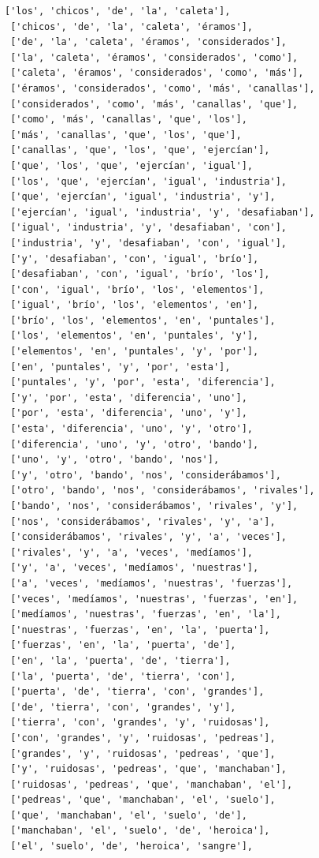 \documentclass[11pt]{article}
\begin{document}
\begin{tcolorbox}[breakable, size=fbox, boxrule=1pt, pad at break*=1mm,colback=cellbackground, colframe=cellborder]
\begin{Verbatim}[commandchars=\\\{\}]
 ['los', 'chicos', 'de', 'la', 'caleta'],
 ['chicos', 'de', 'la', 'caleta', 'éramos'],
 ['de', 'la', 'caleta', 'éramos', 'considerados'],
 ['la', 'caleta', 'éramos', 'considerados', 'como'],
 ['caleta', 'éramos', 'considerados', 'como', 'más'],
 ['éramos', 'considerados', 'como', 'más', 'canallas'],
 ['considerados', 'como', 'más', 'canallas', 'que'],
 ['como', 'más', 'canallas', 'que', 'los'],
 ['más', 'canallas', 'que', 'los', 'que'],
 ['canallas', 'que', 'los', 'que', 'ejercían'],
 ['que', 'los', 'que', 'ejercían', 'igual'],
 ['los', 'que', 'ejercían', 'igual', 'industria'],
 ['que', 'ejercían', 'igual', 'industria', 'y'],
 ['ejercían', 'igual', 'industria', 'y', 'desafiaban'],
 ['igual', 'industria', 'y', 'desafiaban', 'con'],
 ['industria', 'y', 'desafiaban', 'con', 'igual'],
 ['y', 'desafiaban', 'con', 'igual', 'brío'],
 ['desafiaban', 'con', 'igual', 'brío', 'los'],
 ['con', 'igual', 'brío', 'los', 'elementos'],
 ['igual', 'brío', 'los', 'elementos', 'en'],
 ['brío', 'los', 'elementos', 'en', 'puntales'],
 ['los', 'elementos', 'en', 'puntales', 'y'],
 ['elementos', 'en', 'puntales', 'y', 'por'],
 ['en', 'puntales', 'y', 'por', 'esta'],
 ['puntales', 'y', 'por', 'esta', 'diferencia'],
 ['y', 'por', 'esta', 'diferencia', 'uno'],
 ['por', 'esta', 'diferencia', 'uno', 'y'],
 ['esta', 'diferencia', 'uno', 'y', 'otro'],
 ['diferencia', 'uno', 'y', 'otro', 'bando'],
 ['uno', 'y', 'otro', 'bando', 'nos'],
 ['y', 'otro', 'bando', 'nos', 'considerábamos'],
 ['otro', 'bando', 'nos', 'considerábamos', 'rivales'],
 ['bando', 'nos', 'considerábamos', 'rivales', 'y'],
 ['nos', 'considerábamos', 'rivales', 'y', 'a'],
 ['considerábamos', 'rivales', 'y', 'a', 'veces'],
 ['rivales', 'y', 'a', 'veces', 'medíamos'],
 ['y', 'a', 'veces', 'medíamos', 'nuestras'],
 ['a', 'veces', 'medíamos', 'nuestras', 'fuerzas'],
 ['veces', 'medíamos', 'nuestras', 'fuerzas', 'en'],
 ['medíamos', 'nuestras', 'fuerzas', 'en', 'la'],
 ['nuestras', 'fuerzas', 'en', 'la', 'puerta'],
 ['fuerzas', 'en', 'la', 'puerta', 'de'],
 ['en', 'la', 'puerta', 'de', 'tierra'],
 ['la', 'puerta', 'de', 'tierra', 'con'],
 ['puerta', 'de', 'tierra', 'con', 'grandes'],
 ['de', 'tierra', 'con', 'grandes', 'y'],
 ['tierra', 'con', 'grandes', 'y', 'ruidosas'],
 ['con', 'grandes', 'y', 'ruidosas', 'pedreas'],
 ['grandes', 'y', 'ruidosas', 'pedreas', 'que'],
 ['y', 'ruidosas', 'pedreas', 'que', 'manchaban'],
 ['ruidosas', 'pedreas', 'que', 'manchaban', 'el'],
 ['pedreas', 'que', 'manchaban', 'el', 'suelo'],
 ['que', 'manchaban', 'el', 'suelo', 'de'],
 ['manchaban', 'el', 'suelo', 'de', 'heroica'],
 ['el', 'suelo', 'de', 'heroica', 'sangre'],

\end{Verbatim}
\end{tcolorbox}
\end{document}
